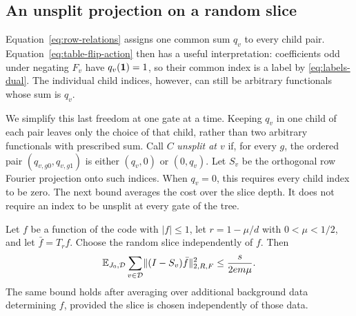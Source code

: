 \subsection{An unsplit projection on a random slice}

Equation~\eqref{eq:row-relations} assigns one common sum $q_v$ to every
child pair. Equation~\eqref{eq:table-flip-action} then has a useful
interpretation: coefficients odd under negating $F_v$ have
$q_v(\mathbf 1)=1$, so their common index is a label by
\eqref{eq:labels-dual}. The individual child indices, however, can
still be arbitrary functionals whose sum is $q_v$.

We simplify this last freedom at one gate at a time. Keeping $q_v$ in
one child of each pair leaves only the choice of that child, rather
than two arbitrary functionals with prescribed sum.
Call $C$ \emph{unsplit at $v$} if, for every $g$, the ordered pair
$(q_{v,g0},q_{v,g1})$ is either $(q_v,0)$ or $(0,q_v)$.
Let $S_v$ be the orthogonal row Fourier projection onto such
indices.  When $q_v=0$, this requires every child index to be zero.
The next bound averages the cost over the slice depth. It does not
require an index to be unsplit at every gate of the tree.

\begin{lemma}
\label{lem:unsplit}
Let $f$ be a function of the code with $|f|\le1$, let
$r=1-\mu/d$ with $0<\mu<1/2$, and let $\bar f=T_rf$.
Choose the random slice independently of $f$.  Then
\begin{equation}
 \mathbb E_{J_0,\mathcal D}\sum_{v\in\mathcal D}
       \lVert(I-S_v)\bar f\rVert_{2,R,F}^{2}
       \le \frac{s}{2e m\mu}.
 \label{eq:unsplit-bound}
\end{equation}
The same bound holds after averaging over additional background
data determining $f$, provided the slice is chosen independently
of those data.
\end{lemma}

